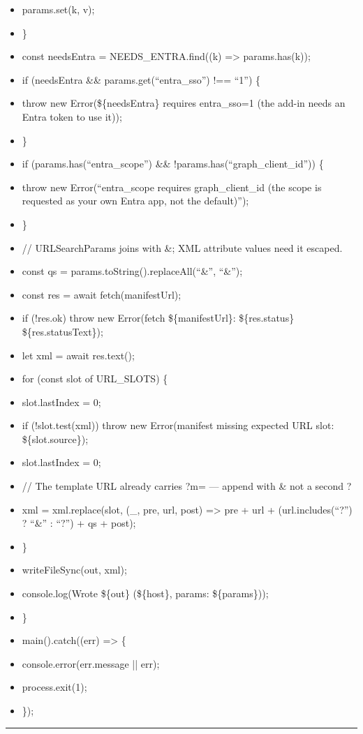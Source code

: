 \documentclass[11pt]{article}
\begin{document}
\begin{itemize}[leftmargin=*,itemsep=2pt,topsep=2pt]
\item {} params.set(k, v);
\item {} \}
\item {} const needsEntra = NEEDS\_\allowbreak{}ENTRA.find((k) => params.has(k));
\item {} if (needsEntra \&\& params.get(``entra\_\allowbreak{}sso'') !== ``1'') \{
\item {} throw new Error(\$\{needsEntra\} requires entra\_\allowbreak{}sso=1 (the add-in needs an Entra token to use it));
\item {} \}
\item {} if (params.has(``entra\_\allowbreak{}scope'') \&\& !params.has(``graph\_\allowbreak{}client\_\allowbreak{}id'')) \{
\item {} throw new Error(``entra\_\allowbreak{}scope requires graph\_\allowbreak{}client\_\allowbreak{}id (the scope is requested as your own Entra app, not the default)'');
\item {} \}
\item {} // URLSearchParams joins with \&; XML attribute values need it escaped.
\item {} const qs = params.toString().replaceAll(``\&'', ``\&'');
\item {} const res = await fetch(manifestUrl);
\item {} if (!res.ok) throw new Error(fetch \$\{manifestUrl\}: \$\{res.status\} \$\{res.statusText\});
\item {} let xml = await res.text();
\item {} for (const slot of URL\_\allowbreak{}SLOTS) \{
\item {} slot.lastIndex = 0;
\item {} if (!slot.test(xml)) throw new Error(manifest missing expected URL slot: \$\{slot.source\});
\item {} slot.lastIndex = 0;
\item {} // The template URL already carries ?m= — append with \& not a second ?
\item {} xml = xml.replace(slot, (\_\allowbreak{}, pre, url, post) => pre + url + (url.includes(``?'') ? ``\&'' : ``?'') + qs + post);
\item {} \}
\item {} writeFileSync(out, xml);
\item {} console.log(Wrote \$\{out\} (\$\{host\}, params: \$\{params\}));
\item {} \}
\item {} main().catch((err) => \{
\item {} console.error(err.message || err);
\item {} process.exit(1);
\item {} \});
\end{itemize}

\vspace{0.8em}\hrule\vspace{0.8em}
\end{document}
